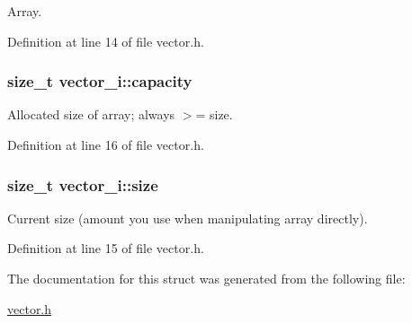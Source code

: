 \-Array. 



\-Definition at line 14 of file vector.\-h.

\hypertarget{structvector__i_a8e7421832635519ee2ccebd19298b705}{
\subsubsection[{capacity}]{\setlength{\rightskip}{0pt plus 5cm}size\-\_\-t {\bf vector\-\_\-i\-::capacity}}}\label{structvector__i_a8e7421832635519ee2ccebd19298b705}


\-Allocated size of array; always $>$= size. 



\-Definition at line 16 of file vector.\-h.

\hypertarget{structvector__i_a8df52068982f4b7dcaa024b37f243282}{
\subsubsection[{size}]{\setlength{\rightskip}{0pt plus 5cm}size\-\_\-t {\bf vector\-\_\-i\-::size}}}\label{structvector__i_a8df52068982f4b7dcaa024b37f243282}


\-Current size (amount you use when manipulating array directly). 



\-Definition at line 15 of file vector.\-h.



\-The documentation for this struct was generated from the following file\-:\begin{DoxyCompactItemize}
\item 
\hyperlink{vector_8h}{vector.\-h}\end{DoxyCompactItemize}
